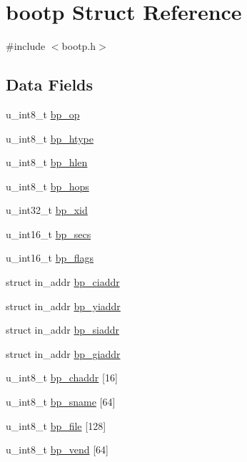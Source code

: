 \hypertarget{structbootp}{}\section{bootp Struct Reference}
\label{structbootp}


{\ttfamily \#include $<$bootp.\+h$>$}

\subsection*{Data Fields}
\begin{DoxyCompactItemize}
\item 
u\+\_\+int8\+\_\+t \hyperlink{structbootp_a2fbdfe50d20b5c3ec8f8a12f9391ac38}{bp\+\_\+op}
\item 
u\+\_\+int8\+\_\+t \hyperlink{structbootp_a7e46e2cd48193d8a2a62dd9235a5aaa4}{bp\+\_\+htype}
\item 
u\+\_\+int8\+\_\+t \hyperlink{structbootp_ac1d179994947404fbace3dd1b08471a1}{bp\+\_\+hlen}
\item 
u\+\_\+int8\+\_\+t \hyperlink{structbootp_a394c358f06dd78666e3acf7b73335c1a}{bp\+\_\+hops}
\item 
u\+\_\+int32\+\_\+t \hyperlink{structbootp_a918b4094f3f6ea72db8c44c56ef6cb0a}{bp\+\_\+xid}
\item 
u\+\_\+int16\+\_\+t \hyperlink{structbootp_ad101842ff21b7513c875597ae7a38af5}{bp\+\_\+secs}
\item 
u\+\_\+int16\+\_\+t \hyperlink{structbootp_aee6d964ccc411f86116fbcc684bbcf21}{bp\+\_\+flags}
\item 
struct in\+\_\+addr \hyperlink{structbootp_ae788ea99fd3530334e342f9958fa8bd5}{bp\+\_\+ciaddr}
\item 
struct in\+\_\+addr \hyperlink{structbootp_a39ada1b8db03fa2f5c7d3c8f60d04cd2}{bp\+\_\+yiaddr}
\item 
struct in\+\_\+addr \hyperlink{structbootp_ad0a620e30687c9015ca6fa3d4e2b6552}{bp\+\_\+siaddr}
\item 
struct in\+\_\+addr \hyperlink{structbootp_a8fa360090979c50c99b37eda37940d31}{bp\+\_\+giaddr}
\item 
u\+\_\+int8\+\_\+t \hyperlink{structbootp_a932c59a12776903939d4856b5c227472}{bp\+\_\+chaddr} \mbox{[}16\mbox{]}
\item 
u\+\_\+int8\+\_\+t \hyperlink{structbootp_a52a89eb60f8f6dc046dec6b1481ae49d}{bp\+\_\+sname} \mbox{[}64\mbox{]}
\item 
u\+\_\+int8\+\_\+t \hyperlink{structbootp_a17ba52dbcdbd63660e46692139740a99}{bp\+\_\+file} \mbox{[}128\mbox{]}
\item 
u\+\_\+int8\+\_\+t \hyperlink{structbootp_a23764ee7fe9112d5e98f91862f3e28b0}{bp\+\_\+vend} \mbox{[}64\mbox{]}
\end{DoxyCompactItemize}


